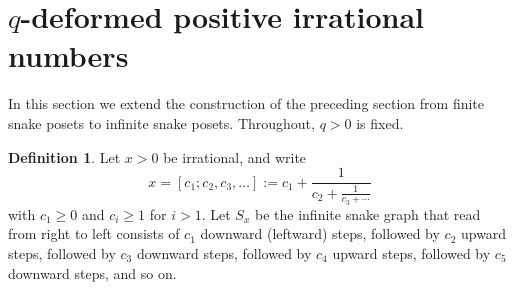 \documentclass[12pt]{article}
\theoremstyle{plain}
\theoremstyle{definition}
\newtheorem{definition}[theorem]{Definition}
\theoremstyle{remark}
\begin{document}
% 
% 
% 

\section{$q$-deformed positive irrational numbers}
\label{sec:irrational}

In this section we extend the construction of the preceding section
from finite snake posets to infinite snake posets.
Throughout, $q>0$ is fixed.

\begin{definition}
Let $x>0$ be irrational, and write
\[ x = [c_1;c_2,c_3,\dots] := c_1+\frac{1}{c_2+\frac{1}{c_3+\cdots}} \]
with $c_1\ge0$ and $c_i\ge1$ for $i>1$.
Let $S_x$ be the infinite snake graph that read from right to left
consists of $c_1$ downward (leftward) steps, followed by $c_2$ upward steps,
followed by $c_3$ downward steps, followed by $c_4$ upward steps,
followed by $c_5$ downward steps, and so on. 
\end{definition}
\end{document}
